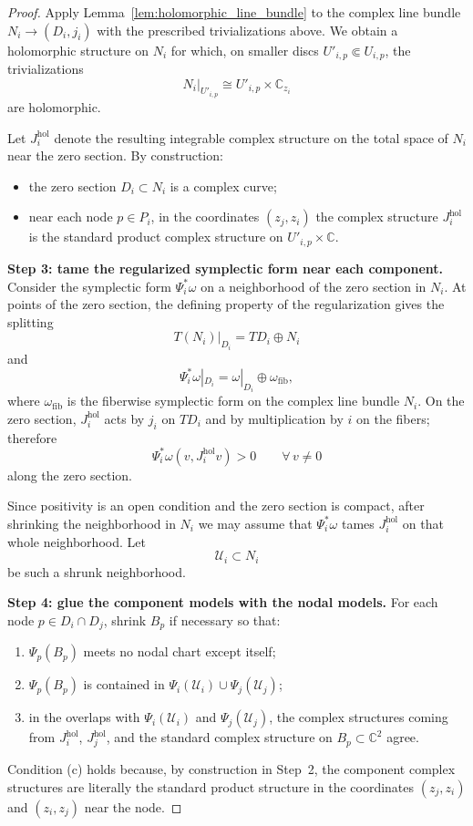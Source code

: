 \documentclass[11pt]{article}
\theoremstyle{remark}
\newcommand{\CC}{\mathbb{C}}
\begin{document}
\begin{proof}
Apply Lemma~\ref{lem:holomorphic_line_bundle} to the complex line bundle
$N_i\to (D_i,j_i)$ with the prescribed trivializations above.
We obtain a holomorphic structure on $N_i$ for which, on smaller discs
$U'_{i,p}\Subset U_{i,p}$, the trivializations
\[
N_i|_{U'_{i,p}} \cong U'_{i,p}\times \CC_{z_i}
\]
are holomorphic.

Let $J_i^{\mathrm{hol}}$ denote the resulting integrable complex structure on
the total space of $N_i$ near the zero section.
By construction:

\begin{itemize}
\item
the zero section $D_i\subset N_i$ is a complex curve;
\item
near each node $p\in P_i$, in the coordinates $(z_j,z_i)$ the complex structure
$J_i^{\mathrm{hol}}$ is the standard product complex structure on
$U'_{i,p}\times \CC$.
\end{itemize}

\medskip
\noindent\textbf{Step 3: tame the regularized symplectic form near each component.}
Consider the symplectic form $\Psi_i^*\omega$ on a neighborhood of the zero section in $N_i$.
At points of the zero section, the defining property of the regularization gives the splitting
\[
T(N_i)|_{D_i}=TD_i\oplus N_i
\]
and
\[
\Psi_i^*\omega|_{D_i}
=
\omega|_{D_i}\oplus \omega_{\mathrm{fib}},
\]
where $\omega_{\mathrm{fib}}$ is the fiberwise symplectic form on the complex line
bundle $N_i$.
On the zero section, $J_i^{\mathrm{hol}}$ acts by $j_i$ on $TD_i$ and by multiplication
by $i$ on the fibers; therefore
\[
\Psi_i^*\omega(v, J_i^{\mathrm{hol}}v)>0
\qquad
\forall\, v\neq 0
\]
along the zero section.

Since positivity is an open condition and the zero section is compact, after shrinking
the neighborhood in $N_i$ we may assume that $\Psi_i^*\omega$ tames
$J_i^{\mathrm{hol}}$ on that whole neighborhood.
Let
\[
\mathcal U_i\subset N_i
\]
be such a shrunk neighborhood.

\medskip
\noindent\textbf{Step 4: glue the component models with the nodal models.}
For each node $p\in D_i\cap D_j$, shrink $B_p$ if necessary so that:
\begin{enumerate}[label=\textup{(\alph*)}]
\item
$\Psi_p(B_p)$ meets no nodal chart except itself;
\item
$\Psi_p(B_p)$ is contained in $\Psi_i(\mathcal U_i)\cup \Psi_j(\mathcal U_j)$;
\item
in the overlaps with $\Psi_i(\mathcal U_i)$ and $\Psi_j(\mathcal U_j)$,
the complex structures coming from $J_i^{\mathrm{hol}}$, $J_j^{\mathrm{hol}}$,
and the standard complex structure on $B_p\subset\CC^2$ agree.
\end{enumerate}
Condition \textup{(c)} holds because, by construction in Step~2, the component
complex structures are literally the standard product structure in the coordinates
$(z_j,z_i)$ and $(z_i,z_j)$ near the node.


\end{proof}
\end{document}
